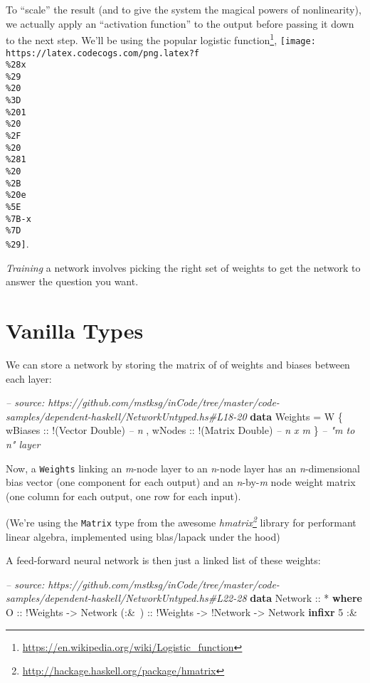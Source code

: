 \documentclass[]{article}
\newenvironment{Shaded}{\begin{snugshade}}{\end{snugshade}}
\newcommand{\CommentTok}[1]{\textcolor[rgb]{0.56,0.35,0.01}{\textit{#1}}}
\newcommand{\DataTypeTok}[1]{\textcolor[rgb]{0.13,0.29,0.53}{#1}}
\newcommand{\DecValTok}[1]{\textcolor[rgb]{0.00,0.00,0.81}{#1}}
\newcommand{\FunctionTok}[1]{\textcolor[rgb]{0.00,0.00,0.00}{#1}}
\newcommand{\KeywordTok}[1]{\textcolor[rgb]{0.13,0.29,0.53}{\textbf{#1}}}
\newcommand{\NormalTok}[1]{#1}
\newcommand{\OtherTok}[1]{\textcolor[rgb]{0.56,0.35,0.01}{#1}}
\renewcommand{\href}[2]{#2\footnote{\url{#1}}}
\begin{document}
To ``scale'' the result (and to give the system the magical powers of
nonlinearity), we actually apply an ``activation function'' to the output before
passing it down to the next step. We'll be using the popular
\href{https://en.wikipedia.org/wiki/Logistic_function}{logistic function},
\texttt{[image: https://latex.codecogs.com/png.latex?f\\\%28x\\\%29\\\%20\\\%3D\\\%201\\\%20\\\%2F\\\%20\\\%281\\\%20\\\%2B\\\%20e\\\%5E\\\%7B-x\\\%7D\\\%29]}.

\emph{Training} a network involves picking the right set of weights to get the
network to answer the question you want.

\hypertarget{vanilla-types}{%
\section{Vanilla Types}\label{vanilla-types}}

We can store a network by storing the matrix of of weights and biases between
each layer:

\begin{Shaded}
\begin{Highlighting}[]
\CommentTok{-- source: https://github.com/mstksg/inCode/tree/master/code-samples/dependent-haskell/NetworkUntyped.hs#L18-20}
\KeywordTok{data} \DataTypeTok{Weights} \FunctionTok{=} \DataTypeTok{W}\NormalTok{ \{}\OtherTok{ wBiases ::} \FunctionTok{!}\NormalTok{(}\DataTypeTok{Vector} \DataTypeTok{Double}\NormalTok{)  }\CommentTok{-- n}
\NormalTok{                 ,}\OtherTok{ wNodes  ::} \FunctionTok{!}\NormalTok{(}\DataTypeTok{Matrix} \DataTypeTok{Double}\NormalTok{)  }\CommentTok{-- n x m}
\NormalTok{                 \}                              }\CommentTok{-- "m to n" layer}
\end{Highlighting}
\end{Shaded}

Now, a \texttt{Weights} linking an \emph{m}-node layer to an \emph{n}-node layer
has an \emph{n}-dimensional bias vector (one component for each output) and an
\emph{n}-by-\emph{m} node weight matrix (one column for each output, one row for
each input).

(We're using the \texttt{Matrix} type from the awesome
\emph{\href{http://hackage.haskell.org/package/hmatrix}{hmatrix}} library for
performant linear algebra, implemented using blas/lapack under the hood)

A feed-forward neural network is then just a linked list of these weights:

\begin{Shaded}
\begin{Highlighting}[]
\CommentTok{-- source: https://github.com/mstksg/inCode/tree/master/code-samples/dependent-haskell/NetworkUntyped.hs#L22-28}
\KeywordTok{data} \DataTypeTok{Network}\OtherTok{ ::} \FunctionTok{*} \KeywordTok{where}
    \DataTypeTok{O}\OtherTok{     ::} \FunctionTok{!}\DataTypeTok{Weights}
          \OtherTok{->} \DataTypeTok{Network}
\OtherTok{    (:&~) ::} \FunctionTok{!}\DataTypeTok{Weights}
          \OtherTok{->} \FunctionTok{!}\DataTypeTok{Network}
          \OtherTok{->} \DataTypeTok{Network}
\KeywordTok{infixr} \DecValTok{5} \FunctionTok{:&~}
\end{Highlighting}
\end{Shaded}
\end{document}
